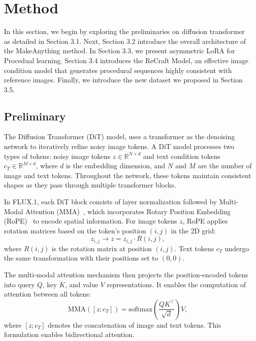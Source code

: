 
\section{Method}

In this section, we begin by exploring the preliminaries on diffusion transformer as detailed in Section 3.1. Next, Section 3.2 introduce the overall architecture of the MakeAnything method. In Section 3.3, we present asymmetric LoRA for Procedual learning. Section 3.4 introduces the ReCraft Model, an effective image condition model that generates procedural sequences highly consistent with reference images. Finally, we introduce the new dataset we proposed in Section 3.5.



\subsection{Preliminary}

The Diffusion Transformer (DiT) model,  uses a transformer as the denoising network to iteratively refine noisy image tokens. A DiT model processes two types of tokens: noisy image tokens $z \in \mathbb{R}^{N \times d}$ and text condition tokens $c_T \in \mathbb{R}^{M \times d}$, where $d$ is the embedding dimension, and $N$ and $M$ are the number of image and text tokens. Throughout the network, these tokens maintain consistent shapes as they pass through multiple transformer blocks.

In FLUX.1, each DiT block consists of layer normalization followed by Multi-Modal Attention (MMA)~\cite{mma}, which incorporates Rotary Position Embedding (RoPE)~\cite{rope} to encode spatial information. For image tokens $z$, RoPE applies rotation matrices based on the token's position $(i,j)$ in the 2D grid:
\begin{equation}
z_{i,j} \rightarrow z=z_{i,j} \cdot R(i,j),
\end{equation}
where $R(i,j)$ is the rotation matrix at position $(i,j)$. Text tokens $c_T$ undergo the same transformation with their positions set to $(0,0)$.

The multi-modal attention mechanism then projects the position-encoded tokens into query $Q$, key $K$, and value $V$ representations. It enables the computation of attention between all tokens:
\begin{equation}
\text{MMA}([z; c_T]) = \text{softmax}\left(\frac{QK^\top}{\sqrt{d}}\right)V,
\end{equation}
where $[z; c_T]$ denotes the concatenation of image and text tokens. This formulation enables bidirectional attention.

